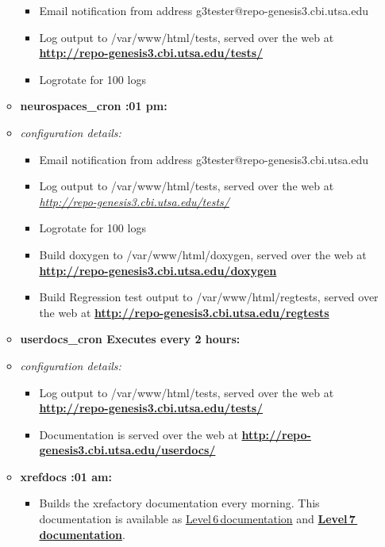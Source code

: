 \documentclass[12pt]{article}
\begin{document}
\begin{itemize}
\begin{itemize}
\begin{itemize}
	\item Email notification from address g3tester@repo-genesis3.cbi.utsa.edu
	\item Log output to /var/www/html/tests, served over the web at \href{http://repo-genesis3.cbi.utsa.edu/tests/}{\bf http://repo-genesis3.cbi.utsa.edu/tests/}
	\item Logrotate for 100 logs
\end{itemize}

\item[] {\bf neurospaces\_cron :01 pm:}
	\item {\it configuration details:} 
\begin{itemize}

	\item Email notification from address g3tester@repo-genesis3.cbi.utsa.edu
	\item Log output to /var/www/html/tests, served over the web at \href{http://repo-genesis3.cbi.utsa.edu/tests/}{\it http://repo-genesis3.cbi.utsa.edu/tests/}
	\item Logrotate for 100 logs
	\item Build doxygen to /var/www/html/doxygen, served over the web at \href{http://repo-genesis3.cbi.utsa.edu/doxygen}{\bf http://repo-genesis3.cbi.utsa.edu/doxygen}
	\item Build Regression test output to /var/www/html/regtests, served over the web at \href{http://repo-genesis3.cbi.utsa.edu/regtests}{\bf http://repo-genesis3.cbi.utsa.edu/regtests}
\end{itemize}

\item[] {\bf userdocs\_cron \- Executes every 2 hours:}
	\item {\it configuration details:} 
\begin{itemize}

	\item Log output to /var/www/html/tests, served over the web at \href{http://repo-genesis3.cbi.utsa.edu/tests/}{\bf http://repo-genesis3.cbi.utsa.edu/tests/}
	\item Documentation is served over the web at \href{http://repo-genesis3.cbi.utsa.edu/userdocs/}{\bf http://repo-genesis3.cbi.utsa.edu/userdocs/}
\end{itemize}

\item[] {\bf xrefdocs :01 am:}
\begin{itemize}
	\item Builds the xrefactory documentation every morning.  This documentation is available as \href{http://www.neurospaces.org/doxygen-menu.html}{Level\,6\,documentation} and \href{http://www.neurospaces.org/cxref-menu.html}{\bf Level\,7\,documentation}.
\end{itemize}
\end{itemize}

\end{itemize}
\end{document}
